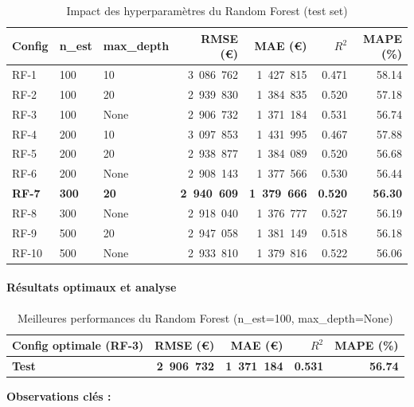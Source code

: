 \documentclass[12pt,a4paper]{article}
\begin{document}
\begin{table}[H]
\centering
\begin{tabular}{@{}lllrrrr@{}}
\toprule
\textbf{Config} & \textbf{n\_est} & \textbf{max\_depth} &
\textbf{RMSE (€)} & \textbf{MAE (€)} & \textbf{$R^2$} & \textbf{MAPE (\%)} \\ \midrule
RF-1  & 100 & 10   & 3~086~762 & 1~427~815 & 0.471 & 58.14 \\
RF-2  & 100 & 20   & 2~939~830 & 1~384~835 & 0.520 & 57.18 \\
RF-3  & 100 & None & 2~906~732 & 1~371~184 & 0.531 & 56.74 \\
RF-4  & 200 & 10   & 3~097~853 & 1~431~995 & 0.467 & 57.88 \\
RF-5  & 200 & 20   & 2~938~877 & 1~384~089 & 0.520 & 56.68 \\
RF-6  & 200 & None & 2~908~143 & 1~377~566 & 0.530 & 56.44 \\
\textbf{RF-7} & \textbf{300} & \textbf{20}   & \textbf{2~940~609} & \textbf{1~379~666} & \textbf{0.520} & \textbf{56.30} \\
RF-8  & 300 & None & 2~918~040 & 1~376~777 & 0.527 & 56.19 \\
RF-9  & 500 & 20   & 2~947~058 & 1~381~149 & 0.518 & 56.18 \\
RF-10 & 500 & None & 2~933~810 & 1~379~816 & 0.522 & 56.06 \\ \midrule
\end{tabular}
\caption{Impact des hyperparamètres du Random Forest (test set)}
\end{table}

\paragraph{Résultats optimaux et analyse}

\begin{table}[H]
\centering
\begin{tabular}{@{}lrrrr@{}}
\toprule
\textbf{Config optimale (RF-3)} & \textbf{RMSE (€)} & \textbf{MAE (€)} & \textbf{$R^2$} & \textbf{MAPE (\%)} \\ \midrule
\textbf{Test} & \textbf{2~906~732} & \textbf{1~371~184} & \textbf{0.531} & \textbf{56.74} \\ \bottomrule
\end{tabular}
\caption{Meilleures performances du Random Forest (n\_est=100, max\_depth=None)}
\end{table}

\textbf{Observations clés :}
\end{document}
